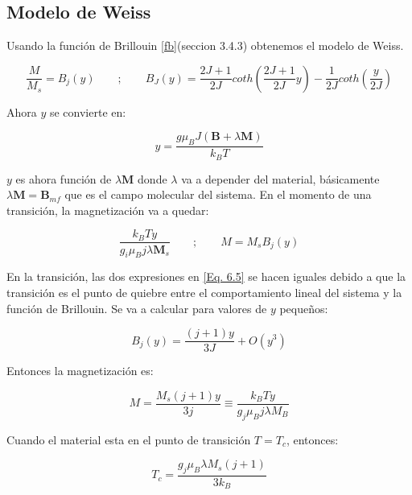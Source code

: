\documentclass[11pt,fleqn]{book}
\renewcommand{\vec}[1]{\mathbf{#1}}
\begin{document}
\subsection{Modelo de Weiss}
Usando la función de Brillouin \ref{fb}(seccion 3.4.3) obtenemos el modelo de Weiss. 

\begin{equation*}
    \frac{M}{M_{s}}=B_{j}(y)\qquad;\qquad   B_{J}(y)=\frac{2J+1}{2J}coth\left(\frac{2J+1}{2J}y\right)-\frac{1}{2J}coth\left(\frac{y}{2J}\right)
\end{equation*}

Ahora $y$ se convierte en:

\begin{equation}
    y=\frac{g\mu_{B}J(\vec{B}+\lambda\vec{M})}{k_{B}T}
    \label{Eq. 6.4}
\end{equation}

$y$ es ahora función de $\lambda\vec{M}$ donde $\lambda$ va a depender del material, básicamente $\lambda\vec{M}=\vec{B}_{mf}$ que es el campo molecular del sistema. En el momento de una transición, la magnetización va a quedar:

\begin{equation}
    \frac{k_{B}Ty}{g_{i}\mu_{B}j\lambda\vec{M}_{s}}\qquad;\qquad M=M_{s}B_{j}(y)
    \label{Eq. 6.5}
\end{equation}

En la transición, las dos expresiones en \ref{Eq. 6.5} se hacen iguales debido a que la transición es el punto de quiebre entre el comportamiento lineal del sistema y la función de Brillouin. Se va a calcular para valores de $y$ pequeños:



\begin{equation}
    B_{j}(y)=\frac{(j+1)y}{3J}+O(y^{3})
    \label{Eq. 6.6}
\end{equation} 

Entonces la magnetización es:

\begin{equation}
    M=\frac{M_{s}(j+1)y}{3j}\equiv\frac{k_{B}Ty}{g_{j}\mu_{B}j\lambda M_{B}}
    \label{Eq. 6.7}
\end{equation}

Cuando el material esta en el punto de transición $T=T_{c}$, entonces:

\begin{equation}
    T_{c}=\frac{g_{j}\mu_{B}\lambda M_{s}(j+1)}{3k_{B}}
        \label{Eq. 6.8}
\end{equation}
\end{document}
